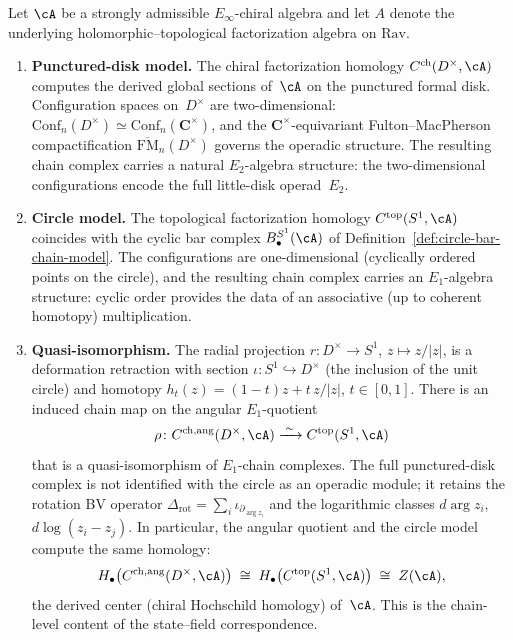 \begin{proposition}%
\label{prop:chain-D-vs-S1}%
%
%
%
Let $\cA$ be a strongly admissible $E_\infty$-chiral algebra
and let $A$ denote the underlying holomorphic--topological
factorization algebra on $\mathrm{Rav}$.
\begin{enumerate}[label=\textup{(\roman*)}]
\item \textbf{Punctured-disk model.}
 The chiral factorization homology $C^{\mathrm{ch}}(D^\times,\cA)$
 computes the derived global sections of~$\cA$ on the punctured
 formal disk.
 Configuration spaces on~$D^\times$ are two-dimensional:
 $\mathrm{Conf}_n(D^\times)\simeq
 \mathrm{Conf}_n(\mathbf{C}^\times)$, and the
 $\mathbf{C}^\times$-equivariant Fulton--MacPherson
 compactification
 $\overline{\mathrm{FM}}_n(D^\times)$ governs the
 operadic structure.
 The resulting chain complex carries a natural $E_2$-algebra
 structure: the two-dimensional configurations encode the
 full little-disk operad~$E_2$.

\item \textbf{Circle model.}
 The topological factorization homology $C^{\mathrm{top}}(S^1,\cA)$
 coincides with the cyclic bar complex $B^{S^1}_\bullet(\cA)$
 of Definition~\textup{\ref{def:circle-bar-chain-model}}.
 The configurations are one-dimensional
 (cyclically ordered points on the circle),
 and the resulting chain complex carries an $E_1$-algebra
 structure: cyclic order provides the data of an
 associative (up to coherent homotopy) multiplication.

\item \textbf{Quasi-isomorphism.}
 The radial projection
 $r\colon D^\times\to S^1$, $z\mapsto z/|z|$,
 is a deformation retraction with section
 $\iota\colon S^1\hookrightarrow D^\times$ (the
 inclusion of the unit circle) and homotopy
 $h_t(z)=(1-t)z + t\,z/|z|$, $t\in[0,1]$.
 There is an induced chain map on the angular \(E_1\)-quotient
 \begin{equation}\label{eq:rho-chain-map}
 \rho\colon C^{\mathrm{ch,ang}}(D^\times,\cA)
 \xrightarrow{\;\sim\;}
 C^{\mathrm{top}}(S^1,\cA)
 \end{equation}
 that is a quasi-isomorphism of \(E_1\)-chain complexes.
The full punctured-disk complex is not identified with the circle as
an operadic module; it retains the rotation BV operator
\(\Delta_{\mathrm{rot}}=\sum_i\iota_{\partial_{\arg z_i}}\) and the
logarithmic classes \(d\arg z_i\), \(d\log(z_i-z_j)\). In particular,
the angular quotient and the circle model compute the same homology:
 \[
 H_\bullet\bigl(C^{\mathrm{ch,ang}}(D^\times,\cA)\bigr)
 \;\cong\;
 H_\bullet\bigl(C^{\mathrm{top}}(S^1,\cA)\bigr)
 \;\cong\;
 Z(\cA),
 \]
 the derived center (chiral Hochschild homology)
 of~$\cA$. This is the chain-level content of the
 state--field correspondence.


\end{enumerate}
\end{proposition}
